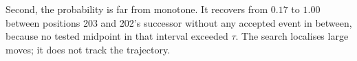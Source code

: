 \documentclass{article}
\begin{document}
Second, the probability is far from monotone. It recovers from $0.17$ to
$1.00$ between positions 203 and 202's successor without any accepted
event in between, because no tested midpoint in that interval exceeded
$\tau$. The search localises large moves; it does not track the
trajectory.




% 


\end{document}
